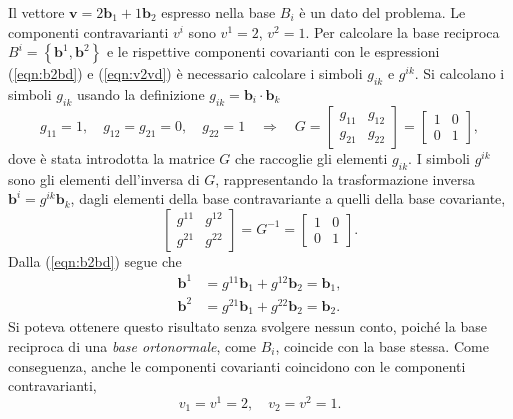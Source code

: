 \vspace{5pt}\noindent
%
Il vettore $\bm{v} = 2\bm{b}_1 + 1 \bm{b}_2$ espresso nella base $B_i$ è un dato del problema. Le componenti contravarianti $v^i$ sono $v^1 = 2$, $v^2=1$.
%
Per calcolare la base reciproca $B^i = \left\{ \bm{b}^1 , \bm{b}^2 \right\}$ e le rispettive componenti covarianti con le espressioni (\ref{eqn:b2bd}) e (\ref{eqn:v2vd}) è necessario calcolare i simboli $g_{ik}$ e $g^{ik}$. 
Si calcolano i simboli $g_{ik}$ usando la definizione $g_{ik} = \bm{b}_i \cdot \bm{b}_k$
\begin{equation}
 g_{11} = 1 , \quad g_{12} = g_{21} = 0 , \quad g_{22} = 1
 \quad \Rightarrow \quad
 G = \begin{bmatrix} g_{11} & g_{12} \\ g_{21} & g_{22} \end{bmatrix}
   = \begin{bmatrix} 1 & 0 \\ 0 & 1 \end{bmatrix} ,
\end{equation}
 dove è stata introdotta la matrice $G$ che raccoglie gli elementi $g_{ik}$. I simboli $g^{ik}$ sono gli elementi dell'inversa di $G$, rappresentando la trasformazione inversa $\bm{b}^i = g^{ik}\bm{b}_k$, dagli elementi della base contravariante a quelli della base covariante,
\begin{equation}
 \begin{bmatrix} g^{11} & g^{12} \\ g^{21} & g^{22} \end{bmatrix} = G^{-1} =
 \begin{bmatrix} 1 & 0 \\ 0 & 1 \end{bmatrix} .
\end{equation}
%
Dalla (\ref{eqn:b2bd}) segue che
\begin{equation}
\begin{aligned}
 \bm{b}^1 & = g^{11} \bm{b}_1 + g^{12} \bm{b}_2 = \bm{b}_1 , \\
 \bm{b}^2 & = g^{21} \bm{b}_1 + g^{22} \bm{b}_2 = \bm{b}_2 .
\end{aligned}
\end{equation}
Si poteva ottenere questo risultato senza svolgere nessun conto, poiché la base reciproca di una \textit{base ortonormale}, come $B_i$, coincide con la base stessa. Come conseguenza, anche le componenti covarianti coincidono con le componenti contravarianti,
\begin{equation}
  v_1 = v^1 = 2 , \quad v_2 = v^2 = 1 .
\end{equation}
